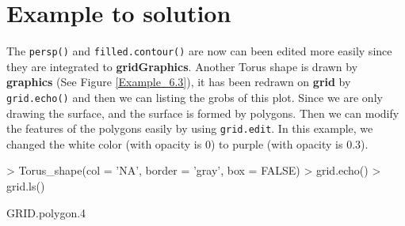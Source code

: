 \documentclass{report}
\begin{document}
\section{Example to solution}
The \texttt{persp()} and \texttt{filled.contour()} are now can been edited more easily since they are integrated to \textbf{gridGraphics}. Another Torus shape is drawn by \textbf{graphics} (See Figure \ref{Example_6.3}), it has been redrawn on \textbf{grid} by \texttt{grid.echo()} and then we can listing the grobs of this plot. Since we are only drawing the surface, and the surface is formed by polygons. Then we can modify the features of the polygons easily by using \texttt{grid.edit}. In this example, we changed the white color (with opacity is 0) to purple (with opacity is 0.3).\\
\begin{Schunk}
\begin{Sinput}
> Torus_shape(col = 'NA', border = 'gray', box = FALSE)
> grid.echo()
> grid.ls()
\end{Sinput}
\begin{Soutput}
GRID.polygon.4
\end{Soutput}
\end{Schunk}
\end{document}
